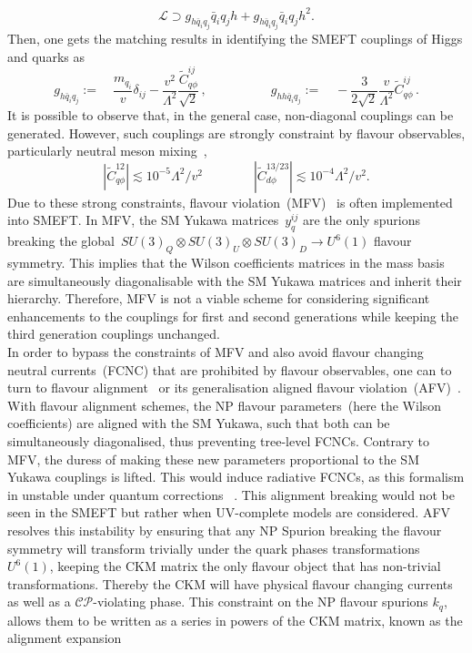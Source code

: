 \begin{equation}
	\mathcal{L}\supset g_{h\bar{q}_i q_j}\bar{q}_i q_j h + g_{h\bar{q}_i q_j}\bar{q}_i q_j h^2.
\end{equation}
Then, one gets the matching results in identifying the SMEFT couplings of Higgs and quarks as
\begin{equation}
	g_{h\bar{q}_i q_j} := \quad \frac{m_{q_i}}{v}\delta_{ij}-\frac{v^2}{\Lambda^2} \frac{	\tilde{C}_{q \phi}^{ij}}{\sqrt{2}}\,, \quad \quad \quad \quad \quad g_{h h\bar{q}_i q_j} := \quad -\frac{3}{2\sqrt{2}}\frac{v}{\Lambda^2}	\tilde{C}_{q \phi}^{ij}\,. \label{eq:couplingsEFT}
\end{equation}
It is possible to observe that, in the general case,  non-diagonal couplings can be generated. However, such couplings are strongly constraint by flavour observables, particularly neutral meson mixing~\cite{Blankenburg:2012ex},
\begin{equation}
	|\tilde{C}_{q\phi}^{12}| \lesssim 10^{-5} \Lambda^2/v^2 \quad \quad  \quad \quad | \tilde{C}_{d\phi}^{13/23}| \lesssim 10^{-4} \Lambda^2/v^2.
\end{equation}
Due to these strong constraints, flavour violation~(MFV)~\cite{DAmbrosio:2002vsn} is often implemented into SMEFT. In MFV, the SM Yukawa matrices~$y_q^{ij}$ are the only spurions breaking the global~$SU(3)_Q \otimes SU(3)_U \otimes SU(3)_D \to U^6(1)$ flavour symmetry. This implies that the Wilson coefficients matrices in the mass basis are simultaneously diagonalisable with the SM Yukawa matrices and inherit their hierarchy.  Therefore,  MFV is not a viable scheme for considering significant enhancements to the couplings for first and second generations while keeping the third generation couplings unchanged. \\ In order to bypass the constraints of MFV and also avoid flavour changing neutral currents~(FCNC) that are prohibited by flavour observables, one can to turn to flavour alignment~\cite{Pich:2009sp,Pich:2010ic} or its generalisation aligned flavour violation~(AFV)~\cite{Egana-Ugrinovic:2018znw}. \\ 
With flavour alignment schemes, the NP flavour parameters~(here the Wilson coefficients) are aligned with the SM Yukawa, such that both can be simultaneously diagonalised, thus preventing tree-level FCNCs.  Contrary to MFV, the duress of making these new parameters proportional to the SM Yukawa couplings is lifted. This would induce radiative FCNCs, as this formalism in unstable under quantum corrections ~\cite{Ferreira:2010xe,Jung:2010ik,Botella:2015yfa}. This alignment breaking would not be seen in the SMEFT but rather when UV-complete models are considered. AFV resolves this instability by ensuring that any NP Spurion breaking the flavour symmetry will transform trivially under the quark phases transformations $ U^6(1)$, keeping the CKM matrix the only flavour object that has non-trivial transformations. Thereby the CKM will have physical flavour changing currents as well as a $\mathcal{CP}$-violating phase. This constraint on the NP flavour spurions $k_q$, allows them to be written as a series in powers of the CKM matrix, known as the alignment expansion
